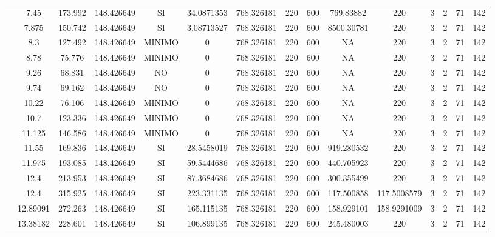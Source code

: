 \begin{table}[H]
{\begin{tabular}{|c|c|c|c|c|c|c|c|c|c|c|c|c|c|c|}
\cline{2-15}    & 7.45 & 173.992 & 148.426649 & SI  & 34.0871353 & 768.326181 & 220 & 600 & 769.83882 & 220 & 3   & 2   & 71  & 142 \bigstrut\\
\cline{2-15}    & 7.875 & 150.742 & 148.426649 & SI  & 3.08713527 & 768.326181 & 220 & 600 & 8500.30781 & 220 & 3   & 2   & 71  & 142 \bigstrut\\
\cline{2-15}    & 8.3 & 127.492 & 148.426649 & MINIMO & 0   & 768.326181 & 220 & 600 & NA  & 220 & 3   & 2   & 71  & 142 \bigstrut\\
\cline{2-15}    & 8.78 & 75.776 & 148.426649 & MINIMO & 0   & 768.326181 & 220 & 600 & NA  & 220 & 3   & 2   & 71  & 142 \bigstrut\\
\cline{2-15}    & 9.26 & 68.831 & 148.426649 & NO  & 0   & 768.326181 & 220 & 600 & NA  & 220 & 3   & 2   & 71  & 142 \bigstrut\\
\cline{2-15}    & 9.74 & 69.162 & 148.426649 & NO  & 0   & 768.326181 & 220 & 600 & NA  & 220 & 3   & 2   & 71  & 142 \bigstrut\\
\cline{2-15}    & 10.22 & 76.106 & 148.426649 & MINIMO & 0   & 768.326181 & 220 & 600 & NA  & 220 & 3   & 2   & 71  & 142 \bigstrut\\
\cline{2-15}    & 10.7 & 123.336 & 148.426649 & MINIMO & 0   & 768.326181 & 220 & 600 & NA  & 220 & 3   & 2   & 71  & 142 \bigstrut\\
\cline{2-15}    & 11.125 & 146.586 & 148.426649 & MINIMO & 0   & 768.326181 & 220 & 600 & NA  & 220 & 3   & 2   & 71  & 142 \bigstrut\\
\cline{2-15}    & 11.55 & 169.836 & 148.426649 & SI  & 28.5458019 & 768.326181 & 220 & 600 & 919.280532 & 220 & 3   & 2   & 71  & 142 \bigstrut\\
\cline{2-15}    & 11.975 & 193.085 & 148.426649 & SI  & 59.5444686 & 768.326181 & 220 & 600 & 440.705923 & 220 & 3   & 2   & 71  & 142 \bigstrut\\
\cline{2-15}    & 12.4 & 213.953 & 148.426649 & SI  & 87.3684686 & 768.326181 & 220 & 600 & 300.355499 & 220 & 3   & 2   & 71  & 142 \bigstrut\\
\cline{2-15}    & 12.4 & 315.925 & 148.426649 & SI  & 223.331135 & 768.326181 & 220 & 600 & 117.500858 & 117.5008579 & 3   & 2   & 71  & 142 \bigstrut\\
\cline{2-15}    & 12.89091 & 272.263 & 148.426649 & SI  & 165.115135 & 768.326181 & 220 & 600 & 158.929101 & 158.9291009 & 3   & 2   & 71  & 142 \bigstrut\\
\cline{2-15}    & 13.38182 & 228.601 & 148.426649 & SI  & 106.899135 & 768.326181 & 220 & 600 & 245.480003 & 220 & 3   & 2   & 71  & 142 \bigstrut\\

\end{tabular}}
\end{table}
